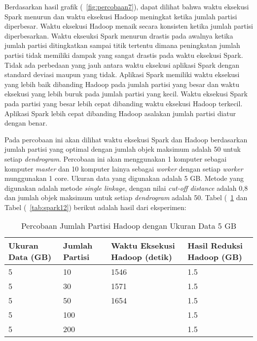 Berdasarkan hasil grafik (~\ref{fig:percobaan7}), dapat dilihat bahwa waktu eksekusi Spark menurun dan waktu eksekusi Hadoop meningkat ketika jumlah partisi diperbesar. Waktu eksekusi Hadoop menaik secara konsisten ketika jumlah partisi diperbesarkan. Waktu ekseuksi Spark menurun drastis pada awalnya ketika jumlah partisi ditingkatkan sampai titik tertentu dimana peningkatan jumlah partisi tidak memiliki dampak yang sangat drastis pada waktu eksekusi Spark. Tidak ada perbedaan yang jauh antara waktu eksekusi aplikasi Spark dengan standard deviasi maupun yang tidak. Aplikasi Spark memiliki waktu eksekusi yang lebih baik dibanding Hadoop pada jumlah partisi yang besar dan waktu eksekusi yang lebih buruk pada jumlah partisi yang kecil. Waktu eksekusi Spark pada partisi yang besar lebih cepat dibanding waktu eksekusi Hadoop terkecil. Aplikasi Spark lebih cepat dibanding Hadoop asalakan jumlah partisi diatur dengan benar.







Pada percobaan ini akan dilihat waktu eksekusi Spark dan Hadoop berdasarkan jumlah partisi yang optimal dengan jumlah objek maksimum adalah 50 untuk setiap \textit{dendrogram}. Percobaan ini akan menggunakan 1 komputer sebagai komputer \textit{master} dan 10 komputer lainya sebagai \textit{worker} dengan setiap \textit{worker} munggunakan 1 core. Ukuran data yang digunakan adalah 5 GB. Metode yang digunakan adalah metode \textit{single linkage}, dengan nilai \textit{cut-off distance} adalah 0,8 dan jumlah objek maksimum untuk setiap \textit{dendrogram} adalah 50. Tabel (~\ref{tab:spark11} dan Tabel (~\ref{tab:spark12}) berikut adalah hasil dari eksperimen:





\begin{table}[H] 
	\centering 
	\caption{Percobaan Jumlah Partisi Hadoop dengan Ukuran Data 5 GB}
	\label{tab:spark11}
	\begin{tabular}{|p{3cm}|p{3cm}|p{4cm}|p{4cm}|}
\hline
Ukuran Data (GB) & Jumlah Partisi &  Waktu Eksekusi Hadoop (detik) & Hasil Reduksi Hadoop (GB)\\
\hline
5 & 10 & 1546  & 1.5  \\
\hline
5 & 30 & 1571  & 1.5  \\
\hline
5 & 50 & 1654  & 1.5   \\
\hline
5 & 100 &   & 1.5   \\
\hline
5 & 200 &   & 1.5   \\
\hline


\hline

	\end{tabular} 
\end{table}



